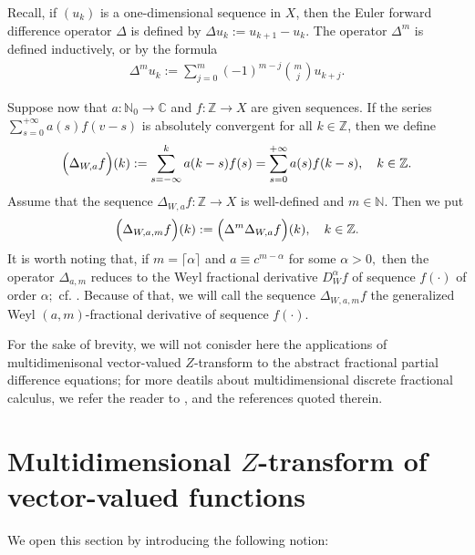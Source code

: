 \documentclass{amsart}
\theoremstyle{definition}
\theoremstyle{remark}
\numberwithin{equation}{section}
\begin{document}
Recall, if $(u_{k})$ is a one-dimensional sequence in $X$, then the Euler forward difference operator $\Delta$ is defined by $\Delta u_{k}:=u_{k+1}-u_{k}.$ The operator $\Delta^{m}$ is defined inductively, or by the formula
\begin{align*}
\Delta^{m}u_{k}:=\sum_{j=0}^{m}(-1)^{m-j}\binom{m}{j}u_{k+j}.
\end{align*}

Suppose now that $a: {\mathbb N}_{0}\rightarrow {\mathbb C}$ and $f: {\mathbb Z}\rightarrow X$ are given sequences. If the series $\sum_{s=0}^{+\infty}a(s)f(v-s)$ is absolutely convergent for all $k\in {\mathbb Z}$, then we define
\begin{align*} 
\Bigl(\Delta_{W,a}f\Bigr)(k):=\sum_{s=-\infty}^{k}a(k-s)f(s)=\sum_{s=0}^{+\infty}a(s)f(k-s),\quad k\in {\mathbb Z}.
\end{align*}
Assume that the sequence $\Delta_{W,a}f: {\mathbb Z}\rightarrow X$ is well-defined and $m\in {\mathbb N}.$ Then we put
$$
\Bigl(\Delta_{W,a,m}f\Bigr)(k):=\Bigl(\Delta^{m}\Delta_{W,a}f\Bigr)(k),\quad k\in {\mathbb Z}.
$$
It is worth noting that, if $m=\lceil \alpha \rceil$ and $a\equiv c^{m-\alpha}$ for some $\alpha>0,$ then the operator $\Delta_{a,m}$ reduces to the Weyl fractional derivative $D_{W}^{\alpha}f$ of sequence $f(\cdot)$ of order $\alpha;$ cf. \cite[Definition 2.3]{abadias}. Because of that,  we will call the sequence $\Delta_{W,a,m}f$ the generalized Weyl $(a,m)$-fractional derivative of sequence $f(\cdot).$
 
For the sake of brevity, we will not conisder here the applications of multidimenisonal vector-valued $Z$-transform to the abstract fractional partial difference equations; for more deatils about multidimensional discrete fractional calculus, we refer the reader to \cite{funkcionalne}, \cite{aksi} and the references quoted therein.

\section{Multidimensional $Z$-transform of vector-valued functions}\label{multi-z}

We open this section by introducing the following notion:
\end{document}
